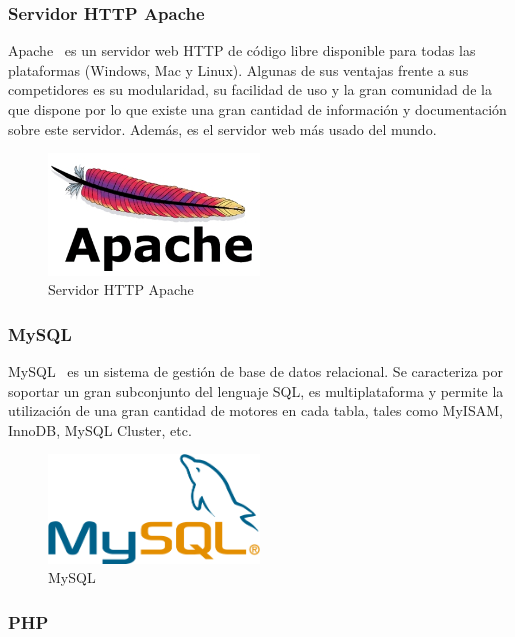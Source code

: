 \subsubsection*{Servidor HTTP Apache}

Apache~\cite{apache} es un servidor web HTTP de código libre disponible para todas las plataformas (Windows, Mac y Linux). Algunas de sus ventajas frente a sus competidores es su modularidad, su facilidad de uso y la gran comunidad de la que dispone por lo que existe una gran cantidad de información y documentación sobre este servidor. Además, es el servidor web más usado del mundo.

\begin{figure}[tbh]
\centering
\label{fig:apache}
\includegraphics[width=0.5\textwidth]{imagenes/apache}
\caption{Servidor HTTP Apache}
\end{figure}

\subsubsection*{MySQL}

MySQL~\cite{mysql} es un sistema de gestión de base de datos relacional. Se caracteriza por soportar un gran subconjunto del lenguaje SQL, es multiplataforma y permite la utilización de una gran cantidad de motores en cada tabla, tales como MyISAM, InnoDB, MySQL Cluster, etc.

\begin{figure}[tbh]
\centering
\label{fig:mysql}
\includegraphics[width=0.5\textwidth]{imagenes/MySQL}
\caption{MySQL}
\end{figure}

\subsubsection*{PHP}

